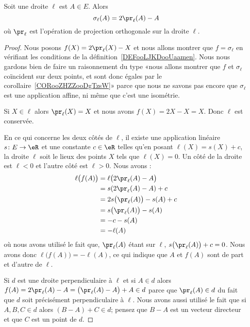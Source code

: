 \begin{lemma}       \label{LEMooZSDRooUkNYer}
    Soit une droite \( \ell\) est \( A\in E\). Alors
    \begin{equation}        \label{EQooVUQDooKuwszl}
        \sigma_{\ell}(A)=2\pr_{\ell}(A)-A
    \end{equation}
    où \( \pr_{\ell}\) est l'opération de projection orthogonale sur la droite \( \ell\).
\end{lemma}

\begin{proof}
    Nous posons \( f(X)=2\pr_{\ell}(X)-X\) et nous allons montrer que \( f=\sigma_{\ell}\) en vérifiant les conditions de la définition~\ref{DEFooLJKDooUaamen}. Nous nous gardons bien de faire un raisonnement du type «nous allons montrer que \( f\) et \( \sigma_{\ell}\) coïncident sur deux points, et sont donc égales par le corollaire~\ref{CORooZHZZooDgTzsW}» parce que nous ne savons pas encore que \( \sigma_{\ell}\) est une application affine, ni même que c'est une isométrie.

    Si \( X\in\ell\) alors \( \pr_{\ell}(X)=X\) et nous avons \( f(X)=2X-X=X\). Donc \( \ell\) est conservée.

    En ce qui concerne les deux côtés de \( \ell\), il existe une application linéaire \( s\colon E\to \eR\) et une constante \( c\in \eR\) telles qu'en posant \( \ell(X)=s(X)+c\), la droite \( \ell\) soit le lieux des points \( X\) tels que \( \ell(X)=0\). Un côté de la droite est \( \ell<0\) et l'autre côté est \( \ell>0\). Nous avons :
    \begin{subequations}
        \begin{align}
            \ell\big( f(A) \big)&=\ell\big( 2\pr_{\ell}(A)-A \big)\\
            &=s(2\pr_{\ell}(A)-A)+c\\
            &=2s\big( \pr_{\ell}(A) \big)-s(A)+c\\
            &=s\big( \pr_{\ell}(A) \big)-s(A)\\
            &=-c-s(A)\\
            &=-\ell(A)
        \end{align}
    \end{subequations}
    où nous avons utilisé le fait que, \( \pr_{\ell}(A)\) étant sur \( \ell\), \( s\big( \pr_{\ell}(A) \big)+c=0\). Nous avons donc \( \ell\big( f(A) \big)=-\ell(A)\), ce qui indique que \( A\) et \( f(A)\) sont de part et d'autre de \( \ell\).

    Si \( d\) est une droite perpendiculaire à \( \ell\) et si \( A\in d\) alors \( f(A)=2\pr_{\ell}(A)-A=  \big( \pr_{\ell}(A)-A \big)+A\in d  \) parce que \( \pr_{\ell}(A)\in d\) du fait que \( d\) soit précisément perpendiculaire à \( \ell\). Nous avons aussi utilisé le fait que si \( A,B,C\in d\) alors \( (B-A)+C\in d\); pensez que \( B-A\) est un vecteur directeur et que \( C\) est un point de \( d\).


\end{proof}
